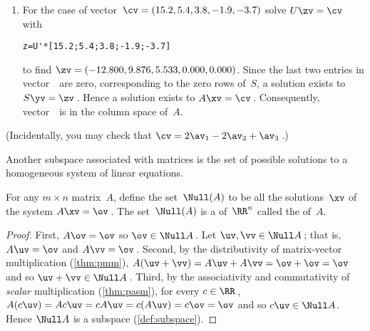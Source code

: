 \begin{example}
\begin{solution}
\begin{enumerate}
\item For the case of vector~\(\cv=(15.2,5.4,3.8,-1.9,-3.7)\) solve \(U\zv=\cv\) with 
\begin{verbatim}
z=U'*[15.2;5.4;3.8;-1.9;-3.7]
\end{verbatim}
to find \(\zv=(-12.800,9.876,5.533,0.000,0.000)\).
Since the last two entries in vector~\zv\ are zero, corresponding to the zero rows of~\(S\), a solution exists to \(S\yv=\zv\)\,.
Hence a solution exists to \(A\xv=\cv\)\,.
Consequently, vector~\cv\ is in the column space of~\(A\).

\end{enumerate}
(Incidentally, you may check that \(\cv=2\av_1-2\av_2+\av_3\)\,.)
\end{solution}
\end{example}






Another subspace associated with matrices is the set of possible solutions to a homogeneous system of linear equations.


\begin{theorem}\label{thm:homosubsp} 
For any $m\times n$ matrix~$A$, define the set~$\Null(A)$ to be all the solutions~$\xv$ of the  system $A\xv=\ov$\,. 
The set~\(\Null(A)\) is a  of~$\RR^n$ called the  of~$A$.
\end{theorem}
\begin{proof} 
First, \(A\ov=\ov\) so \(\ov\in\Null A\)\,.
Let \(\uv,\vv\in\Null A\)\,; that is, \(A\uv=\ov\) and \(A\vv=\ov\)\,.
Second, by the distributivity of matrix-vector multiplication (\autoref{thm:pmm}), \(A(\uv+\vv)=A\uv+A\vv=\ov+\ov=\ov\) and so \(\uv+\vv\in\Null A\)\,.
Third, by the associativity and commutativity of \emph{scalar} multiplication (\autoref{thm:pasm}), for every \(c\in\RR\)\,, \(A(c\uv)=Ac\uv=cA\uv=c(A\uv)=c\ov=\ov\) and so \(c\uv\in\Null A\). 
Hence \(\Null A\) is a subspace (\autoref{def:subspace}).
\end{proof}




